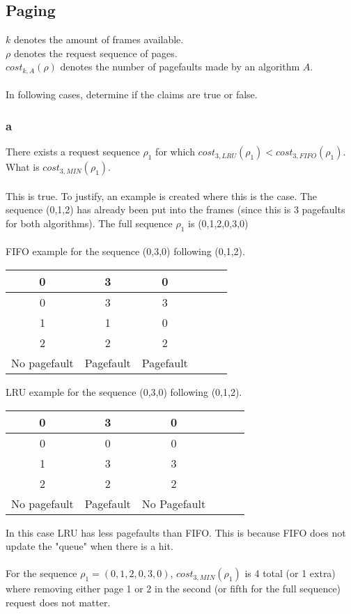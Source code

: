 \documentclass[12pt]{article}
\begin{document}
\subsection{Paging}
$k$ denotes the amount of frames available.\\
$\rho$ denotes the request sequence of pages.\\
$cost_{k,A}(\rho)$ denotes the number of pagefaults made by an algorithm $A$.\\
\\
In following cases, determine if the claims are true or false.
\subsubsection{a}
There exists a request sequence $\rho_1$ for which $cost_{3,LRU}(\rho_1) < cost_{3,FIFO}(\rho_1)$. What is $cost_{3,MIN}(\rho_1)$.\\
\\
This is true. To justify, an example is created where this is the case. The sequence (0,1,2) has already been put into the frames (since this is 3 pagefaults for both algorithms). The full sequence $\rho_1$ is (0,1,2,0,3,0)\\
\\
FIFO example for the sequence (0,3,0) following (0,1,2).\\
\begin{center}
\begin{tabular}{|c|c|c|c|c|c|}
\hline 
0 & 3 & 0 \\ 
\hline 
0 & 3 & 3 \\ 
1 & 1 & 0 \\ 
2 & 2 & 2 \\ 
\hline
No pagefault & Pagefault & Pagefault \\
\hline
\end{tabular}
\end{center}
$ $
\\
LRU example for the sequence (0,3,0) following (0,1,2).\\
\begin{center}
\begin{tabular}{|c|c|c|c|c|c|}
\hline 
0 & 3 & 0 \\ 
\hline 
0 & 0 & 0 \\ 
1 & 3 & 3 \\ 
2 & 2 & 2 \\ 
\hline
No pagefault & Pagefault & No Pagefault \\
\hline
\end{tabular}
\end{center}
$ $
\\
In this case LRU has less pagefaults than FIFO. This is because FIFO does not update the "queue" when there is a hit.\\
\\
For the sequence $\rho_1 =(0,1,2,0,3,0)$, $cost_{3,MIN}(\rho_1)$ is 4 total (or 1 extra) where removing either page 1 or 2 in the second (or fifth for the full sequence) request does not matter.
\end{document}
